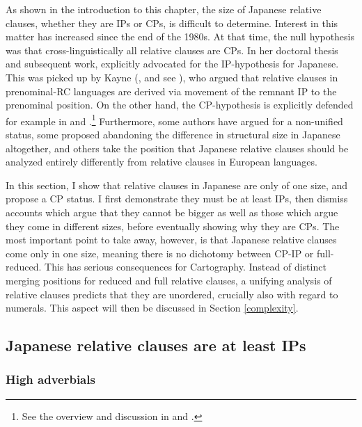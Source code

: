 As shown in the introduction to this chapter, the size of Japanese relative clauses, whether they are IPs or CPs, is difficult to determine. Interest in this matter has increased since the end of the 1980s. At that time, the null hypothesis was that cross-linguistically all relative clauses are CPs. In her doctoral thesis and subsequent work, \citet{murasugi:1991:noun, murasugi:2000:anti} explicitly advocated for the IP-hypothesis for Japanese. This was picked up by Kayne (\citeyear{kayne:1994:anti}, and see \citealt{kayne:2005:japanese}), who argued that relative clauses in prenominal-RC languages are derived via movement of the remnant IP to the prenominal position. On the other hand, the CP-hypothesis is explicitly defended for example in \citet{kaplan:1995:the} and \citet{miyamoto:2017:RC}.\footnote{See the overview and discussion in \citet{hoshi:2004:para} and \citet{miyamoto:2017:RC}.} Furthermore, some authors \citep{krause:2001:rrc, miyagawa:2011:genitive, miyagawa:2012:case, miyagawa:2017:agreement} have argued for a non-unified status, some \citep{sells:2007:finiteness} proposed abandoning the difference in structural size in Japanese altogether, and others \citep{matsumoto:2017:japanese} take the position that Japanese relative clauses should be analyzed entirely differently from relative clauses in European languages.

In this section, I show that relative clauses in Japanese are only of one size, and propose a CP status. I first demonstrate they must be at least IPs, then dismiss accounts which argue that they cannot be bigger as well as those which argue they come in different sizes, before eventually showing why they are CPs. The most important point to take away, however, is that Japanese relative clauses come only in one size, meaning there is no dichotomy between CP-IP or full-reduced. This has serious consequences for Cartography. Instead of distinct merging positions for reduced and full relative clauses, a unifying analysis of relative clauses predicts that they are unordered, crucially also with regard to numerals. This aspect will then be discussed in Section \ref{complexity}.

\subsection{Japanese relative clauses are at least IPs} \label{cinque adj}

\subsubsection{High adverbials}

